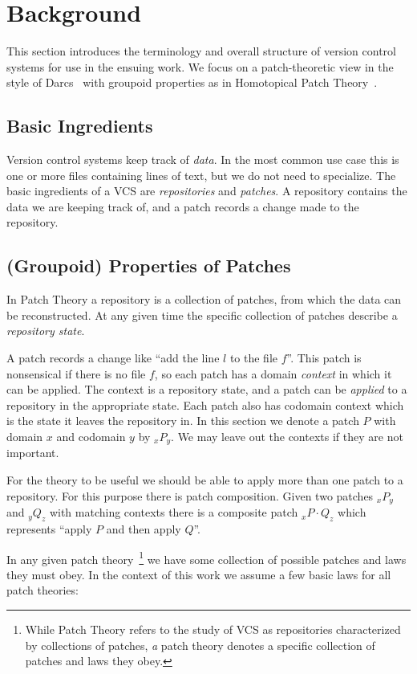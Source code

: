 \section{Background}

This section introduces the terminology and overall structure of version control
systems for use in the ensuing work. We focus on a patch-theoretic view in the
style of Darcs~\cite{Darcs, Lynagh2006, Sittampalam2005,
  jacobson2009formalization} with groupoid properties as in Homotopical Patch
Theory~\cite{Angiuli2016}.

\subsection{Basic Ingredients}
Version control systems keep track of \emph{data}. In the most common use case this is
one or more files containing lines of text, but we do not need to specialize.
The basic ingredients of a VCS are \emph{repositories} and \emph{patches}. A
repository contains the data we are keeping track of, and a patch records a
change made to the repository.

\subsection{(Groupoid) Properties of Patches}
In Patch Theory a repository is a collection of patches, from which the
data can be reconstructed. At any given time the specific collection of patches
describe a \emph{repository state}.

A patch records a change like ``add the line $l$ to the file $f$''. This
patch is nonsensical if there is no file $f$, so each patch has a domain
\emph{context} in which it can be applied. The context is a repository state,
and a patch can be \emph{applied} to a repository in the appropriate state.
Each patch also has codomain context which is the state it leaves the repository
in. In this section we denote a patch $P$ with domain $x$ and codomain $y$ by
$_xP_y$. We may leave out the contexts if they are not important.

For the theory to be useful we should be able to apply more than one patch to a
repository. For this purpose there is patch composition. Given two patches
$_xP_y$ and $_yQ_z$ with matching contexts there is a composite patch $_xP \cdot
Q_z$ which represents ``apply $P$ and then apply $Q$''.

In any given patch theory~\footnote{While Patch Theory refers to the study of
VCS as repositories characterized by collections of patches, \emph{a} patch
theory denotes a specific collection of patches and laws they obey.} we have
some collection of possible patches and laws they must obey. In the context of
this work we assume a few basic laws for all patch theories:


